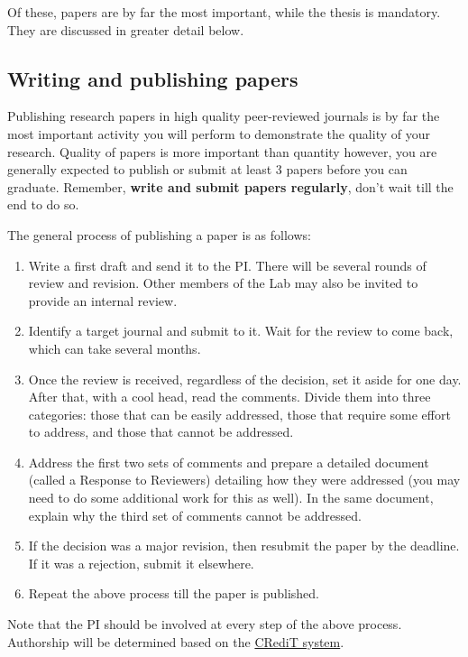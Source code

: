 \documentclass[12pt]{article}
\begin{document}
Of these, papers are by far the most important, while the thesis is mandatory. They are discussed in greater detail below.

\subsection{Writing and publishing papers}
Publishing research papers in high quality peer-reviewed journals is by far the most important activity you will perform to demonstrate the quality of your research. Quality of papers is more important than quantity however, you are generally expected to publish or submit at least 3 papers before you can graduate. Remember, \textbf{write and submit papers regularly}, don't wait till the end to do so.

The general process of publishing a paper is as follows:

\begin{enumerate}
	\item Write a first draft and send it to the PI. There will be several rounds of review and revision. Other members of the Lab may also be invited to provide an internal review.
	\item Identify a target journal and submit to it. Wait for the review to come back, which can take several months.
	\item Once the review is received, regardless of the decision, set it aside for one day. After that, with a cool head, read the comments. Divide them into three categories: those that can be easily addressed, those that require some effort to address, and those that cannot be addressed.
	\item Address the first two sets of comments and prepare a detailed document (called a Response to Reviewers) detailing how they were addressed (you may need to do some additional work for this as well). In the same document, explain why the third set of comments cannot be addressed.
	\item If the decision was a major revision, then resubmit the paper by the deadline. If it was a rejection, submit it elsewhere.
	\item Repeat the above process till the paper is published.
\end{enumerate}

Note that the PI should be involved at every step of the above process. Authorship will be determined based on the \href{https://www.elsevier.com/authors/policies-and-guidelines/credit-author-statement}{CRediT system}.
\end{document}
